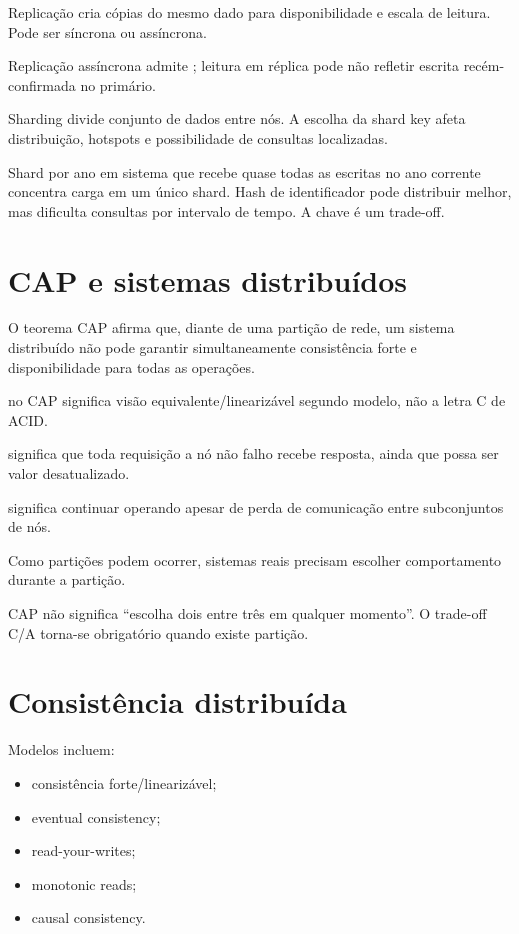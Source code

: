 Replicação cria cópias do mesmo dado para disponibilidade e escala de leitura. Pode ser síncrona ou assíncrona.

Replicação assíncrona admite ; leitura em réplica pode não refletir escrita recém-confirmada no primário.

Sharding divide conjunto de dados entre nós. A escolha da shard key afeta distribuição, hotspots e possibilidade de consultas localizadas.

\begin{example}[hotspot]
Shard por ano em sistema que recebe quase todas as escritas no ano corrente concentra carga em um único shard. Hash de identificador pode distribuir melhor, mas dificulta consultas por intervalo de tempo. A chave é um trade-off.
\end{example}

\section{CAP e sistemas distribuídos}

O teorema CAP afirma que, diante de uma partição de rede, um sistema distribuído não pode garantir simultaneamente consistência forte e disponibilidade para todas as operações.

 no CAP significa visão equivalente/linearizável segundo modelo, não a letra C de ACID.

 significa que toda requisição a nó não falho recebe resposta, ainda que possa ser valor desatualizado.

 significa continuar operando apesar de perda de comunicação entre subconjuntos de nós.

Como partições podem ocorrer, sistemas reais precisam escolher comportamento durante a partição.

\begin{atencao}
CAP não significa ``escolha dois entre três em qualquer momento''. O trade-off C/A torna-se obrigatório quando existe partição.
\end{atencao}

\section{Consistência distribuída}

Modelos incluem:
\begin{itemize}
\item consistência forte/linearizável;
\item eventual consistency;
\item read-your-writes;
\item monotonic reads;
\item causal consistency.
\end{itemize}

